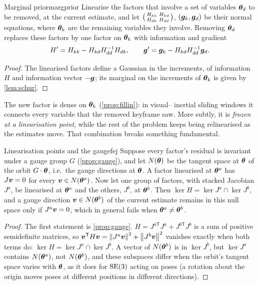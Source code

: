 \begin{proposition}{Marginal prior}{margprior}
Linearise the factors that involve a set of variables $\bm{\theta}_d$ to be
removed, at the current estimate, and let $\begin{psmallmatrix}H_{kk}&
H_{kd}\\H_{dk}&H_{dd}\end{psmallmatrix}$, $(\bm{g}_k,\bm{g}_d)$ be
their normal equations, where $\bm{\theta}_k$ are the remaining variables
they involve. Removing $\bm{\theta}_d$ replaces these factors by one factor
on $\bm{\theta}_k$ with information and gradient
\[
H'=H_{kk}-H_{kd}H_{dd}^{-1}H_{dk},\qquad
\bm{g}'=\bm{g}_k-H_{kd}H_{dd}^{-1}\bm{g}_d .
\]
\end{proposition}

\begin{proof}
The linearised factors define a Gaussian in the increments, of
information $H$ and information vector $-\bm{g}$; its marginal on the
increments of $\bm{\theta}_k$ is given by \cref{lem:schur}.
\end{proof}

The new factor is dense on $\bm{\theta}_k$ (\cref{prop:fillin}): in visual--
inertial sliding windows it connects every variable that the removed
keyframe saw. More subtly, it is \emph{frozen at a linearisation point},
while the rest of the problem keeps being relinearised as the estimates
move. That combination breaks something fundamental.

\begin{proposition}{Linearisation points and the gauge}{fej}
Suppose every factor's residual is invariant under a gauge group $G$
(\cref{prop:gauge}), and let $N(\bm{\theta})$ be the tangent space at
$\bm{\theta}$ of the orbit $G\cdot\bm{\theta}$, i.e.\ the gauge directions at
$\bm{\theta}$. A factor linearised at $\bm{\theta}^a$ has $J\bm{v}=0$ for every
$\bm{v}\in N(\bm{\theta}^a)$. Now let one group of factors, with stacked
Jacobian $J^a$, be linearised at $\bm{\theta}^a$ and the others, $J^b$, at
$\bm{\theta}^b$. Then $\ker H=\ker J^a\cap\ker J^b$, and a gauge direction
$\bm{v}\in N(\bm{\theta}^b)$ of the current estimate remains in this null
space only if $J^a\bm{v}=0$, which in general fails when
$\bm{\theta}^a\neq\bm{\theta}^b$.
\end{proposition}

\begin{proof}
The first statement is \cref{prop:gauge}. $H=J^{a\mathsf T}J^a+
J^{b\mathsf T}J^b$ is a sum of positive semidefinite matrices, so
$\bm{v}^{\mathsf{T}} H\bm{v}=\left\lVert J^a\bm{v}\right\rVert^2+\left\lVert J^b\bm{v}\right\rVert^2$
vanishes exactly when both terms do: $\ker H=\ker J^a\cap\ker J^b$. A
vector of $N(\bm{\theta}^b)$ is in $\ker J^b$, but $\ker J^a$ contains
$N(\bm{\theta}^a)$, not $N(\bm{\theta}^b)$, and these subspaces differ when the
orbit's tangent space varies with $\bm{\theta}$, as it does for $\mathrm{SE}(3)$
acting on poses (a rotation about the origin moves poses at different
positions in different directions).
\end{proof}

